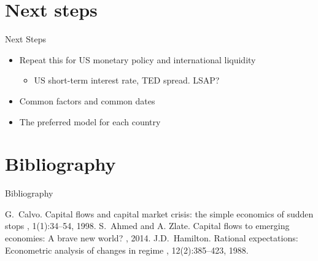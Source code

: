 \documentclass[14pt,xcolor=pdftex,dvipsnames,table]{beamer}
\begin{document}
\section{Next steps}
\begin{frame}{Next Steps}
\begin{itemize}[<+-| alert@+>]
\item Repeat this for US monetary policy and international liquidity
\begin{itemize}
\item US short-term interest rate, TED spread.  LSAP?
\end{itemize}
\item Common factors and common dates
\item The preferred model for each country
\end{itemize}
\end{frame}

\section{Bibliography}

\begin{frame}[allowframebreaks]{Bibliography}
  \begin{thebibliography}{10}    
  \beamertemplatearticlebibitems
    G.~Calvo.
    \newblock Capital flows and capital market crisis: the simple economics of sudden stops
    , 1(1):34--54, 1998.
    S.~Ahmed and A. Zlate.
    \newblock Capital flows to emerging economies: A brave new world?
    , 2014.
    J.D.~Hamilton.
    \newblock Rational expectations: Econometric analysis of changes in regime
    , 12(2):385--423, 1988.
  
  \end{thebibliography}
\end{frame}
\end{document}
